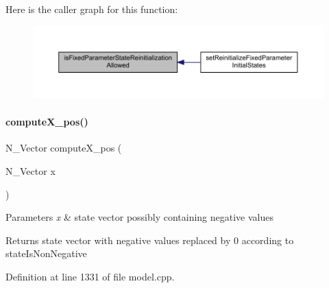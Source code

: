 Here is the caller graph for this function\+:
\nopagebreak
\begin{figure}[H]
\begin{center}
\leavevmode
\includegraphics[width=350pt]{classamici_1_1_model_aee70a0075a3b36896dee7ba80415df3c_icgraph}
\end{center}
\end{figure}
\mbox{\label{classamici_1_1_model_a0c06c5326bb82ceedba30171c122cb8a}} 
\paragraph{\texorpdfstring{compute\+X\+\_\+pos()}{computeX\_pos()}}
{\footnotesize\ttfamily N\+\_\+\+Vector compute\+X\+\_\+pos (\begin{DoxyParamCaption}\item[{N\+\_\+\+Vector}]{x }\end{DoxyParamCaption})\hspace{0.3cm}{\ttfamily [protected]}}


\begin{DoxyParams}{Parameters}
{\em x} & state vector possibly containing negative values \\
\hline
\end{DoxyParams}
\begin{DoxyReturn}{Returns}
state vector with negative values replaced by 0 according to state\+Is\+Non\+Negative 
\end{DoxyReturn}


Definition at line 1331 of file model.\+cpp.

